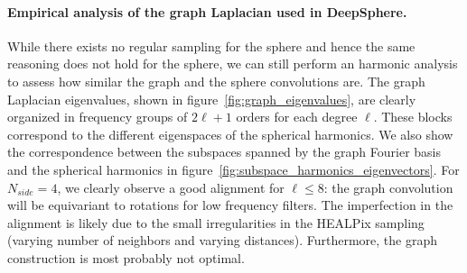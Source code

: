 \documentclass{article} %
\newcommand{\figref}[1]{figure~\ref{fig:#1}}
\renewcommand{\b}[1]{{\bm{#1}}}   %
\newcommand{\1}{\b{1}}              %
\newcommand{\0}{\b{0}}              %
\renewcommand{\L}{\b{L}}
\newcommand{\todo}[1]{{\color[rgb]{.6,.1,.6}{#1}}}
\begin{document}
\paragraph{Empirical analysis of the graph Laplacian used in DeepSphere.} 
While there exists no regular sampling for the sphere and hence the same reasoning does not hold for the sphere, we can still perform an harmonic analysis to assess how similar the graph and the sphere convolutions are.
The graph Laplacian eigenvalues, shown in \figref{graph_eigenvalues}, are clearly organized in frequency groups of $2\ell + 1$ orders for each degree $\ell$.
These blocks correspond to the different eigenspaces of the spherical harmonics.
We also show the correspondence between the subspaces spanned by the graph Fourier basis and the spherical harmonics in \figref{subspace_harmonics_eigenvectors}.
For $N_{side}=4$, we clearly observe a good alignment for $\ell \leq 8$: the graph convolution will be equivariant to rotations for low frequency filters.
The imperfection in the alignment is likely due to the small irregularities in the HEALPix sampling (varying number of neighbors and varying distances).
Furthermore, the graph construction is most probably not optimal.


\end{document}
